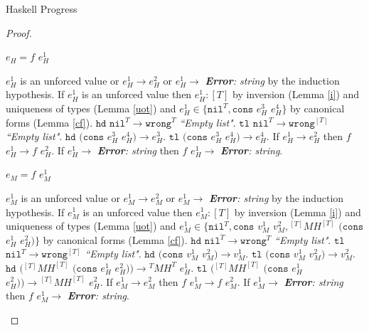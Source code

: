 \begin{theorem}{Haskell Progress}
\begin{proof}
\begin{case}
\end{case}


\begin{case}

$e_{H}=f$ $e_{H}^{1}$

$e_{H}^{1}$ is an unforced value or $e_{H}^{1}\rightarrow e_{H}^{2}$ or $e_{H}^{1}\rightarrow$ \emph{\textbf{Error}: string} by the induction hypothesis.  If $e_{H}^{1}$ is an unforced value then $e_{H}^{1}:[T]$ by inversion (Lemma \ref{i}) and uniqueness of types (Lemma \ref{uot}) and $e_{H}^{1}\in\lbrace\mathtt{nil}^{T},\mathtt{cons}$ $e_{H}^{3}$ $e_{H}^{4}\rbrace$ by canonical forms (Lemma \ref{cf}).  $\mathtt{hd}$ $\mathtt{nil}^{T}\rightarrow\mathtt{wrong}^{T}$ \emph{``Empty list"}.  $\mathtt{tl}$ $\mathtt{nil}^{T}\rightarrow\mathtt{wrong}^{[T]}$ \emph{``Empty list"}.  $\mathtt{hd}$ $(\mathtt{cons}$ $e_{H}^{3}$ $e_{H}^{4})\rightarrow e_{H}^{3}$.  $\mathtt{tl}$ $(\mathtt{cons}$ $e_{H}^{3}$ $e_{H}^{4})\rightarrow e_{H}^{4}$.  If $e_{H}^{1}\rightarrow e_{H}^{2}$ then $f$ $e_{H}^{1}\rightarrow f$ $e_{H}^{2}$.  If $e_{H}^{1}\rightarrow$ \emph{\textbf{Error}: string} then $f$ $e_{H}^{1}\rightarrow$ \emph{\textbf{Error}: string}.

\end{case}


\begin{case}

$e_{M}=f$ $e_{M}^{1}$

$e_{M}^{1}$ is an unforced value or $e_{M}^{1}\rightarrow e_{M}^{2}$ or $e_{M}^{1}\rightarrow$ \emph{\textbf{Error}: string} by the induction hypothesis.  If $e_{M}^{1}$ is an unforced value then $e_{M}^{1}:[T]$ by inversion (Lemma \ref{i}) and uniqueness of types (Lemma \ref{uot}) and $e_{M}^{1}\in\lbrace\mathtt{nil}^{T},\mathtt{cons}$ $v_{M}^{1}$ $v_{M}^{2},{^{[T]}M}H^{[T]}$ $(\mathtt{cons}$ $e_{H}^{1}$ $e_{H}^{2})\rbrace$ by canonical forms (Lemma \ref{cf}).  $\mathtt{hd}$ $\mathtt{nil}^{T}\rightarrow\mathtt{wrong}^{T}$ \emph{``Empty list"}.  $\mathtt{tl}$ $\mathtt{nil}^{T}\rightarrow\mathtt{wrong}^{[T]}$ \emph{``Empty list"}.  $\mathtt{hd}$ $(\mathtt{cons}$ $v_{M}^{1}$ $v_{M}^{2})\rightarrow v_{M}^{1}$.  $\mathtt{tl}$ $(\mathtt{cons}$ $v_{M}^{1}$ $v_{M}^{2})\rightarrow v_{M}^{2}$.  $\mathtt{hd}$ $({^{[T]}M}H^{[T]}$ $(\mathtt{cons}$ $e_{H}^{1}$ $e_{H}^{2}))\rightarrow{^{T}M}H^{T}$ $e_{H}^{1}$.  $\mathtt{tl}$ $({^{[T]}M}H^{[T]}$ $(\mathtt{cons}$ $e_{H}^{1}$ $e_{H}^{2}))\rightarrow{^{[T]}M}H^{[T]}$ $e_{H}^{2}$.  If $e_{M}^{1}\rightarrow e_{M}^{2}$ then $f$ $e_{M}^{1}\rightarrow f$ $e_{M}^{2}$.  If $e_{M}^{1}\rightarrow$ \emph{\textbf{Error}: string} then $f$ $e_{M}^{1}\rightarrow$ \emph{\textbf{Error}: string}.


\end{case}
\end{proof}
\end{theorem}

